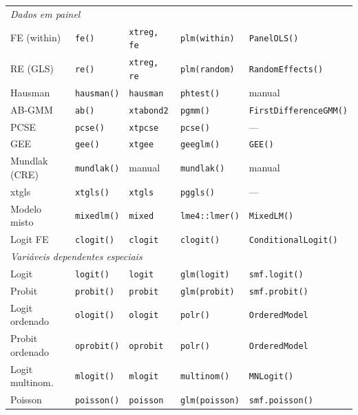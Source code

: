 {\begin{longtable}{lllll}
\multicolumn{5}{l}{\textit{Dados em painel}} \\
FE (within)     & \texttt{fe()}         & \texttt{xtreg, fe}    & \texttt{plm(within)}   & \texttt{PanelOLS()} \\
RE (GLS)        & \texttt{re()}         & \texttt{xtreg, re}    & \texttt{plm(random)}   & \texttt{RandomEffects()} \\
Hausman         & \texttt{hausman()}    & \texttt{hausman}      & \texttt{phtest()}      & manual \\
AB-GMM          & \texttt{ab()}         & \texttt{xtabond2}     & \texttt{pgmm()}        & \texttt{FirstDifferenceGMM()} \\
PCSE            & \texttt{pcse()}       & \texttt{xtpcse}       & \texttt{pcse()}        & — \\
GEE             & \texttt{gee()}        & \texttt{xtgee}        & \texttt{geeglm()}      & \texttt{GEE()} \\
Mundlak (CRE)   & \texttt{mundlak()}    & manual                & \texttt{mundlak()}     & manual \\
xtgls           & \texttt{xtgls()}      & \texttt{xtgls}        & \texttt{pggls()}       & — \\
Modelo misto    & \texttt{mixedlm()}    & \texttt{mixed}        & \texttt{lme4::lmer()}  & \texttt{MixedLM()} \\
Logit FE        & \texttt{clogit()}     & \texttt{clogit}       & \texttt{clogit()}      & \texttt{ConditionalLogit()} \\
\midrule
\multicolumn{5}{l}{\textit{Variáveis dependentes especiais}} \\
Logit           & \texttt{logit()}      & \texttt{logit}        & \texttt{glm(logit)}    & \texttt{smf.logit()} \\
Probit          & \texttt{probit()}     & \texttt{probit}       & \texttt{glm(probit)}   & \texttt{smf.probit()} \\
Logit ordenado  & \texttt{ologit()}     & \texttt{ologit}       & \texttt{polr()}        & \texttt{OrderedModel} \\
Probit ordenado & \texttt{oprobit()}    & \texttt{oprobit}      & \texttt{polr()}        & \texttt{OrderedModel} \\
Logit multinom. & \texttt{mlogit()}     & \texttt{mlogit}       & \texttt{multinom()}    & \texttt{MNLogit()} \\
Poisson         & \texttt{poisson()}    & \texttt{poisson}      & \texttt{glm(poisson)}  & \texttt{smf.poisson()} \\

\end{longtable}}
